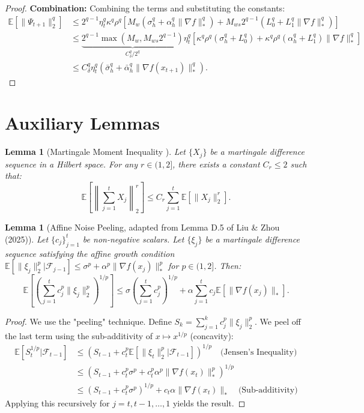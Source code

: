 \documentclass{article}
\theoremstyle{plain}
\newtheorem{lemma}[theorem]{Lemma}
\theoremstyle{definition}
\theoremstyle{remark}
\begin{document}
\begin{proof}
\textbf{Combination:}
Combining the terms and substituting the constants:
\begin{align*}
    \mathbb{E}[\|\Psi_{t+1}\|_2^q] &\le 2^{q-1} \eta_t^q \kappa^q \rho^q \left[ M_w(\sigma_h^q + \alpha_h^q \|\nabla f\|_*^q) + M_{ws} 2^{q-1}(L_0^q + L_1^q \|\nabla f\|_*^q) \right] \\
    &\le \underbrace{2^{q-1} \max(M_w, M_{ws} 2^{q-1})}_{C_\delta^q / 2^q} \eta_t^q \left[ \kappa^q \rho^q (\sigma_h^q + L_0^q) + \kappa^q \rho^q (\alpha_h^q + L_1^q) \|\nabla f\|_*^q \right] \\
    &\le C_\delta^q \eta_t^q \left( \bar{\sigma}_h^q + \bar{\alpha}_h^q \|\nabla f(x_{t+1})\|_*^q \right).
\end{align*}
\end{proof}
\section{Auxiliary Lemmas}

\begin{lemma}[Martingale Moment Inequality \cite{vonbahr1965}]
\label{lemma:vonbahr}
Let $\{X_j\}$ be a martingale difference sequence in a Hilbert space. For any $r \in (1, 2]$, there exists a constant $C_r \le 2$ such that:
\begin{equation}
    \mathbb{E}\left[ \left\| \sum_{j=1}^t X_j \right\|_2^r \right] \le C_r \sum_{j=1}^t \mathbb{E}[\|X_j\|_2^r].
\end{equation}
\end{lemma}

\begin{lemma}[Affine Noise Peeling, adapted from Lemma D.5 of Liu \& Zhou (2025)]
\label{lemma:peeling}
Let $\{c_j\}_{j=1}^t$ be non-negative scalars. Let $\{\xi_j\}$ be a martingale difference sequence satisfying the affine growth condition $\mathbb{E}[\|\xi_j\|_2^p | \mathcal{F}_{j-1}] \le \sigma^p + \alpha^p \|\nabla f(x_j)\|_*^p$ for $p \in (1, 2]$. Then:
\begin{equation}
    \mathbb{E}\left[ \left( \sum_{j=1}^t c_j^p \|\xi_j\|_2^p \right)^{1/p} \right] \le \sigma \left( \sum_{j=1}^t c_j^p \right)^{1/p} + \alpha \sum_{j=1}^t c_j \mathbb{E}[\|\nabla f(x_j)\|_*].
\end{equation}
\end{lemma}
\begin{proof}
We use the "peeling" technique. Define $S_k = \sum_{j=1}^k c_j^p \|\xi_j\|_2^p$. We peel off the last term using the sub-additivity of $x \mapsto x^{1/p}$ (concavity):
\begin{align*}
    \mathbb{E}[S_t^{1/p} | \mathcal{F}_{t-1}] &\le (S_{t-1} + c_t^p \mathbb{E}[\|\xi_t\|_2^p | \mathcal{F}_{t-1}])^{1/p} \quad \text{(Jensen's Inequality)} \\
    &\le (S_{t-1} + c_t^p \sigma^p + c_t^p \alpha^p \|\nabla f(x_t)\|_*^p)^{1/p} \\
    &\le (S_{t-1} + c_t^p \sigma^p)^{1/p} + c_t \alpha \|\nabla f(x_t)\|_* \quad \text{(Sub-additivity)}
\end{align*}
Applying this recursively for $j=t, t-1, \dots, 1$ yields the result.
\end{proof}
\end{document}
